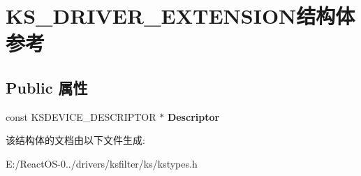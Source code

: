 \hypertarget{struct_k_s___d_r_i_v_e_r___e_x_t_e_n_s_i_o_n}{}\section{K\+S\+\_\+\+D\+R\+I\+V\+E\+R\+\_\+\+E\+X\+T\+E\+N\+S\+I\+O\+N结构体 参考}
\label{struct_k_s___d_r_i_v_e_r___e_x_t_e_n_s_i_o_n}
\subsection*{Public 属性}
\begin{DoxyCompactItemize}
\item 
\mbox{\label{struct_k_s___d_r_i_v_e_r___e_x_t_e_n_s_i_o_n_a34aea066019d1a98dde8bcb89ee8ee44}} 
const K\+S\+D\+E\+V\+I\+C\+E\+\_\+\+D\+E\+S\+C\+R\+I\+P\+T\+OR $\ast$ {\bfseries Descriptor}
\end{DoxyCompactItemize}


该结构体的文档由以下文件生成\+:\begin{DoxyCompactItemize}
\item 
E\+:/\+React\+O\+S-\/0../drivers/ksfilter/ks/kstypes.\+h\end{DoxyCompactItemize}
